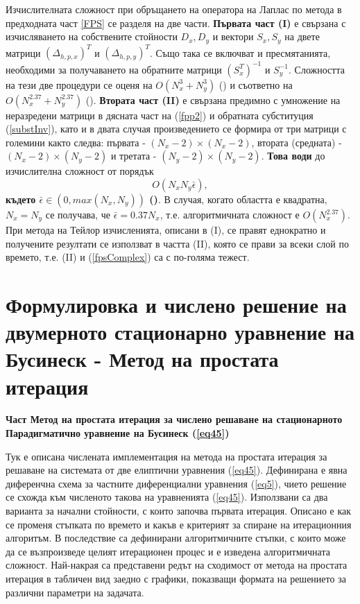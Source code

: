 \documentclass[a5paper]{article}
\newcommand{\be}{\begin{equation}}
\newcommand{\ee}{\end{equation}}
\newcommand{\rf}[1]{(\ref{#1})}
\theoremstyle{remark}
\begin{document}
\begin{normalsize}
Изчислителната сложност при обръщането на оператора на Лаплас по метода в предходната част \ref{FPS} се разделя на две части. \textbf{ Първата част (I)} е свързана с изчисляването на собствените стойности $D_x, D_y$ и вектори $S_x, S_y$ на двете матрици $(\Delta_{h,p,x})^T$ и $(\Delta_{h,p,y})^T$. Също така се включват и пресмятанията, необходими за получаването на обратните матрици $(S_x^T)^{-1}$ и $S_y^{-1}$. Сложността на тези две процедури се оценя на $O(N_x^3+N_y^3)$ (\cite{ref260}) и съответно на $O(N_x^{2.37}+N_y^{2.37})$ (\cite{ref27}). \textbf{Втората част (II)} е свързана предимно с умножение на неразредени матрици в дясната част на \rf{fpp2} и обратната субституция \rf{substInv}, като и в двата случая произведението се формира от три матрици  с големини както следва: първата - $(N_x-2) \times (N_x-2)$, втората (средната) - $(N_x-2) \times (N_y-2)$ и третата - $(N_y-2) \times (N_y-2)$. \textbf{Това води} до изчислителна сложност от порядък
\be\label{fpsComplex}
O(N_x N_y \bar{\epsilon}),
\ee
\textbf{където $\bar{\epsilon} \in (0, max(N_x, N_y))$ (\cite{ref26, ref27})}. В случая, когато областта е квадратна, $N_x = N_y$ се получава, че $\bar{\epsilon} = 0.37 N_x$, т.е. алгоритмичната сложност е $O(N_x^{2.37})$. При метода на Тейлор изчисленията, описани в (I), се правят еднократно и получените резултати се използват в частта (II), която се прави за всеки слой по времето, т.е. (II) и \rf{fpsComplex} са с по-голяма тежест. 
\fi

\newpage
\section{Формулировка и числено решение на двумерното стационарно уравнение на Бусинеск - Метод на простата итерация}\label{ellipticFormulation}

\textbf{Част Метод на простата итерация за числено решаване на стационарното Парадигматично уравнение на Бусинеск \rf{eq45}}

Тук е описана числената имплементация на метода на простата итерация за решаване на системата от две елиптични уравнения \rf{eq45}. Дефинирана е явна диференчна схема за частните диференциални уравнения \rf{eq5}, чието решение се схожда към численото такова на уравненията \rf{eq45}. Използвани са два варианта за начални стойности, с които започва първата итерация. Описано е как се променя стъпката по времето и какъв е критерият за спиране на итерационния алгоритъм. В последствие са дефинирани алгоритмичните стъпки, с които може да се възпроизведе целият итерационен процес и е изведена алгоритмичната сложност. Най-накрая са представени редът на сходимост от метода на простата итерация в табличен вид заедно с графики, показващи формата на решението за различни параметри на задачата. \\


\end{normalsize}
\end{document}
